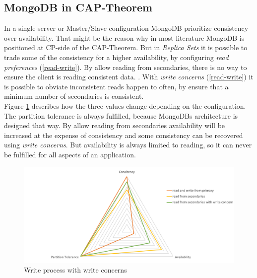 \subsection{MongoDB in CAP-Theorem}
In a single server or Master/Slave configuration MongoDB prioritize consistency over availability. That might be the reason why in most literature MongoDB is positioned at CP-side of the CAP-Theorem. But in \textit{Replica Sets} it is possible to trade some of the consistency for a higher availability, by configuring \textit{read preferences} (\ref{read-write}). By allow reading from secondaries, there is no way to ensure the client is reading consistent data. . With \textit{write concerns} (\ref{read-write}) it is possible to obviate inconsistent reads happen to often, by ensure that a minimum number of secondaries is consistent. \\
Figure \ref{mongodb-cap} describes how the three values change depending on the configuration. The partition tolerance is always fulfilled, because MongoDBs architecture is designed that way. By allow reading from secondaries availability will be increased at the expense of consistency and some consistency can be recovered using \textit{write concerns}. But availability is always limited to reading, so it can never be fulfilled for all aspects of an application.
\begin{figure}[H]
\includegraphics[width=\linewidth,keepaspectratio]{images/mongodb-cap.png}
\caption{Write process with write concerns}
\label{mongodb-cap}
\end{figure}